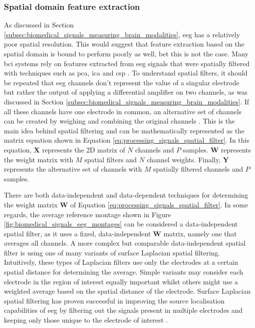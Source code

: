
\subsubsection{Spatial domain feature extraction}
\label{subsubsec:processing_signals_general_pipeline_features_spatialdomain}

As discussed in Section \ref{subsec:biomedical_signals_measuring_brain_modalities}, \gls{eeg} has a relatively poor spatial resolution.
This would suggest that feature extraction based on the spatial domain is bound to perform poorly as well, bet this is not the case.
Many \gls{bci} systems rely on features extracted from \gls{eeg} signals that were spatially filtered with techniques such as \gls{pca}, \gls{ica} and \gls{csp} \citep{bci_book}.
To understand spatial filters, it should be repeated that \gls{eeg} channels don't represent the value of a singular electrode but rather the output of applying a differential amplifier on two channels, as was discussed in Section \ref{subsec:biomedical_signals_measuring_brain_modalities}.
If all these channels have one electrode in common, an alternative set of channels can be created by weighing and combining the original channels \citep{bci_book}.
This is the main idea behind spatial filtering and can be mathematically represented as the matrix equation shown in Equation \ref{eq:processing_signals_spatial_filter}.
In this equation, $\mathbf{X}$ represents the 2D matrix of $N$ channels and $P$ samples.
$\mathbf{W}$ represents the weight matrix with $M$ spatial filters and $N$ channel weights.
Finally, $\mathbf{Y}$ represents the alternative set of channels with $M$ spatially filtered channels and $P$ samples.

There are both data-independent and data-dependent techniques for determining the weight matrix $\mathbf{W}$ of Equation \ref{eq:processing_signals_spatial_filter}.
In some regards, the average reference montage shown in Figure \ref{fig:biomedical_signals_eeg_montages} can be considered a data-independent spatial filter, as it uses a fixed, data-independent $\mathbf{W}$ matrix, namely one that averages all channels.
A more complex but comparable data-independent spatial filter is using one of many variants of surface Laplacian spatial filtering.
Intuitively, these types of Laplacian filters use only the electrodes at a certain spatial distance for determining the average.
Simple variants may consider each electrode in the region of interest equally important whilst others might use a weighted average based on the spatial distance of the electrode.
Surface Laplacian spatial filtering has proven successful in improving the source localisation capabilities of \gls{eeg} by filtering out the signals present in multiple electrodes and keeping only those unique to the electrode of interest \citep{improve_eeg_spatial_laplacian1, improve_eeg_spatial_laplacian2, improve_eeg_spatial_laplacian3}.


